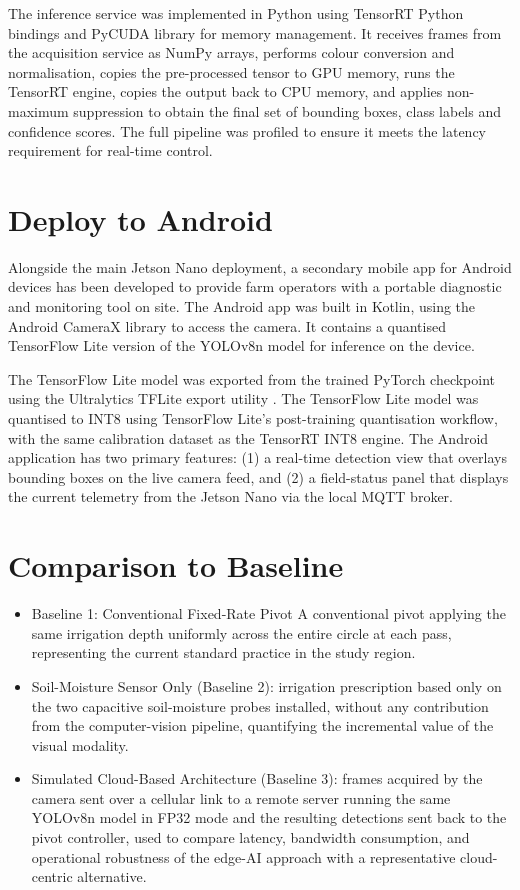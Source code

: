 \documentclass[12pt,a4paper]{report}
\begin{document}
The inference service was implemented in Python using TensorRT Python bindings and PyCUDA library for memory management. It receives frames from the acquisition service as NumPy arrays, performs colour conversion and normalisation, copies the pre-processed tensor to GPU memory, runs the TensorRT engine, copies the output back to CPU memory, and applies non-maximum suppression to obtain the final set of bounding boxes, class labels and confidence scores. The full pipeline was profiled to ensure it meets the latency requirement for real-time control.

\section{Deploy to Android}

Alongside the main Jetson Nano deployment, a secondary mobile app for Android devices has been developed to provide farm operators with a portable diagnostic and monitoring tool on site. The Android app was built in Kotlin, using the Android CameraX library to access the camera. It contains a quantised TensorFlow Lite version of the YOLOv8n model for inference on the device.

The TensorFlow Lite model was exported from the trained PyTorch checkpoint using the Ultralytics TFLite export utility . The TensorFlow Lite model was quantised to INT8 using TensorFlow Lite's post-training quantisation workflow, with the same calibration dataset as the TensorRT INT8 engine. The Android application has two primary features: (1) a real-time detection view that overlays bounding boxes on the live camera feed, and (2) a field-status panel that displays the current telemetry from the Jetson Nano via the local MQTT broker.

\section{Comparison to Baseline}

\begin{itemize}
    \item Baseline 1: Conventional Fixed-Rate Pivot A conventional pivot applying the same irrigation depth uniformly across the entire circle at each pass, representing the current standard practice in the study region.
    \item Soil-Moisture Sensor Only (Baseline 2): irrigation prescription based only on the two capacitive soil-moisture probes installed, without any contribution from the computer-vision pipeline, quantifying the incremental value of the visual modality.
    \item Simulated Cloud-Based Architecture (Baseline 3): frames acquired by the camera sent over a cellular link to a remote server running the same YOLOv8n model in FP32 mode and the resulting detections sent back to the pivot controller, used to compare latency, bandwidth consumption, and operational robustness of the edge-AI approach with a representative cloud-centric alternative.
\end{itemize}
\end{document}
